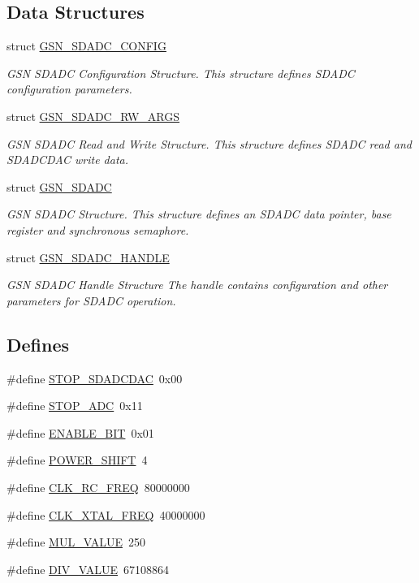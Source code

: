 \subsection*{Data Structures}
\begin{DoxyCompactItemize}
\item 
struct \hyperlink{a00213}{GSN\_\-SDADC\_\-CONFIG}
\begin{DoxyCompactList}\small\item\em GSN SDADC Configuration Structure. This structure defines SDADC configuration parameters. \end{DoxyCompactList}\item 
struct \hyperlink{a00215}{GSN\_\-SDADC\_\-RW\_\-ARGS}
\begin{DoxyCompactList}\small\item\em GSN SDADC Read and Write Structure. This structure defines SDADC read and SDADCDAC write data. \end{DoxyCompactList}\item 
struct \hyperlink{a00212}{GSN\_\-SDADC}
\begin{DoxyCompactList}\small\item\em GSN SDADC Structure. This structure defines an SDADC data pointer, base register and synchronous semaphore. \end{DoxyCompactList}\item 
struct \hyperlink{a00214}{GSN\_\-SDADC\_\-HANDLE}
\begin{DoxyCompactList}\small\item\em GSN SDADC Handle Structure The handle contains configuration and other parameters for SDADC operation. \end{DoxyCompactList}\end{DoxyCompactItemize}
\subsection*{Defines}
\begin{DoxyCompactItemize}
\item 
\#define \hyperlink{a00583_a845259d44644fdb49fa85ceb68ff0df0}{STOP\_\-SDADCDAC}~0x00
\item 
\#define \hyperlink{a00583_a6f4b0c80c6a3b9513f283aba8c3efb56}{STOP\_\-ADC}~0x11
\item 
\#define \hyperlink{a00583_a1281df33299eeb9c697f290e6cb0e550}{ENABLE\_\-BIT}~0x01
\item 
\#define \hyperlink{a00583_a41e27353ee072b0a2098a6fa65905953}{POWER\_\-SHIFT}~4
\item 
\#define \hyperlink{a00583_ab26b47862b744a0e5924fae7bc221229}{CLK\_\-RC\_\-FREQ}~80000000
\item 
\#define \hyperlink{a00583_a65657d27400d4a4b3c0ba706e9fb1585}{CLK\_\-XTAL\_\-FREQ}~40000000
\item 
\#define \hyperlink{a00583_a32393a10899a4ab9ead088201b7126d1}{MUL\_\-VALUE}~250
\item 
\#define \hyperlink{a00583_a361190788ca27b79952dee7533f4556f}{DIV\_\-VALUE}~67108864
\end{DoxyCompactItemize}

